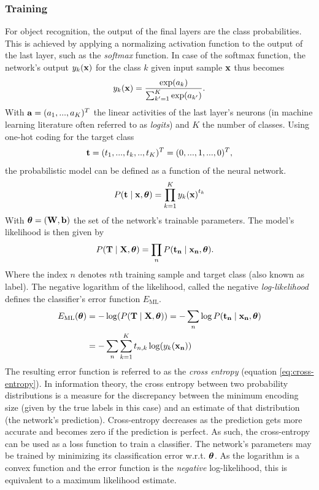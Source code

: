 \subsubsection{Training}\label{sec:training}
For object recognition, the output of the final layers are the class probabilities. This is achieved by applying a normalizing activation function to the output of the last layer, such as the \emph{softmax} function. In case of the softmax function, the network's output $y_k\qty(\vb{x})$ for the class $k$ given input sample $\vb{x}$ thus becomes
\begin{align}
    y_k\qty(\vb{x}) = \frac{\exp(a_k)}{\sum_{k'=1}^K \exp(a_{k'})}.
\end{align}
With $\vb{a}=(a_1,...,a_K)^T$ the linear activities of the last layer's neurons (in machine learning literature often referred to as \emph{logits}) and $K$ the number of classes. Using one-hot coding for the target class
\begin{align}
    \vb{t} = (t_1,...,t_k,..,t_K)^T = (0,...,1,...,0)^T,
\end{align}
the probabilistic model can be defined as a function of the neural network.
\begin{align}
    P\qty(\vb{t}\mid \vb{x},\vb*{\theta}) = \prod_{k=1}^K y_k\qty(\vb{x})^{t_k}
\end{align}
With $\vb*{\theta}=(\vb{W}, \vb{b})$ the set of the network's trainable parameters. The model's likelihood is then given by
\begin{align}
    P\qty(\vb{T}\mid \vb{X}, \vb*{\theta}) &= \prod_n P(\vb{t_n}\mid\vb{x_n},\vb*{\theta}).
\end{align}
Where the index $n$ denotes $n$th training sample and target class (also known as label). The negative logarithm of the likelihood, called the negative \emph{log-likelihood} defines the classifier's error function $E_{\mathrm{ML}}$.
\begin{align}
    E_{\mathrm{ML}}\qty(\vb*{\theta}) &= -\log(P\qty(\vb{T}\mid \vb{X}, \vb*{\theta})) = -\sum_n \log P(\vb{t_n}\mid\vb{x_n},\vb*{\theta}) \\ &= -\sum_n \sum_{k=1}^K t_{n,k}\log(y_{k}\qty(\vb{x_n})) \label{eq:cross-entropy}
\end{align}
The resulting error function is referred to as the \emph{cross entropy} (equation \ref{eq:cross-entropy}). In information theory, the cross entropy between two probability distributions is a measure for the discrepancy between the minimum encoding size (given by the true labels in this case) and an estimate of that distribution (the network's prediction). Cross-entropy decreases as the prediction gets more accurate and becomes zero if the prediction is perfect. As such, the cross-entropy can be used as a loss function to train a classifier. The network's parameters may be trained by minimizing its classification error w.r.t. $\vb*{\theta}$. As the logarithm is a convex function and the error function is the \emph{negative} log-likelihood, this is equivalent to a maximum likelihood estimate.

